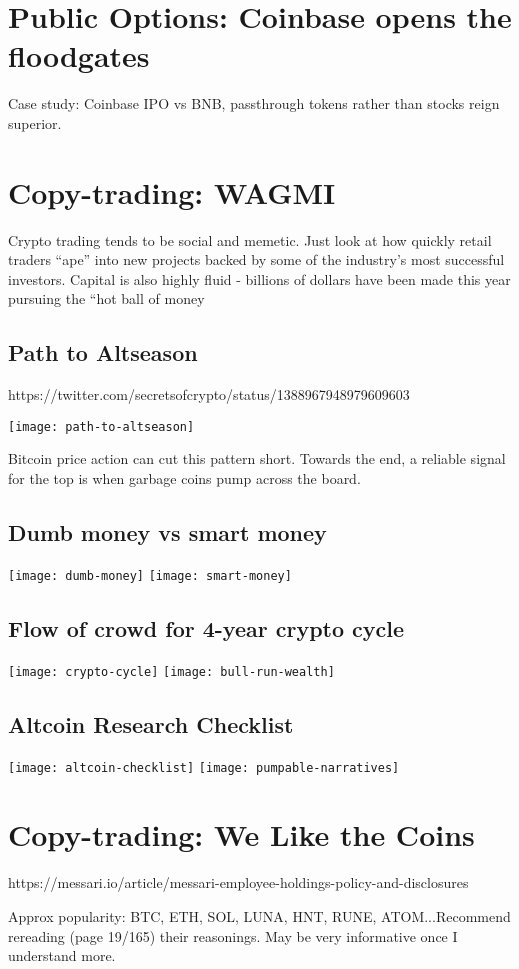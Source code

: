 \documentclass{../notes}
\begin{document}
\section{Public Options: Coinbase opens the floodgates}
Case study: Coinbase IPO vs BNB, passthrough tokens rather than stocks reign superior. 
\section{Copy-trading: WAGMI}
Crypto trading tends to be social and memetic. Just look at how quickly retail traders “ape” into new projects backed by some of the industry’s most successful investors. Capital is also highly fluid - billions of dollars have been made this year pursuing the “hot ball of money
\subsection{Path to Altseason}
https://twitter.com/secretsofcrypto/status/1388967948979609603

\texttt{[image: path-to-altseason]}

Bitcoin price action can cut this pattern short. Towards the end, a reliable signal for the top is when garbage coins pump across the board. 

\subsection{Dumb money vs smart money}
\texttt{[image: dumb-money]}
\texttt{[image: smart-money]}

\subsection{Flow of crowd for 4-year crypto cycle}
\texttt{[image: crypto-cycle]}
\texttt{[image: bull-run-wealth]}

\subsection{Altcoin Research Checklist}
\texttt{[image: altcoin-checklist]}
\texttt{[image: pumpable-narratives]}


\section{Copy-trading: We Like the Coins}
https://messari.io/article/messari-employee-holdings-policy-and-disclosures

Approx popularity: BTC, ETH, SOL, LUNA, HNT, RUNE, ATOM...Recommend rereading (page 19/165) their reasonings. May be very informative once I understand more. 
\end{document}
